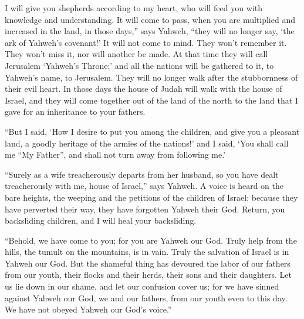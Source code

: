 {I will give you shepherds according to my heart, who will feed you with knowledge and understanding.
It will come to pass, when you are multiplied and increased in the land, in those days,” says Yahweh, “they will no longer say, ‘the ark of Yahweh’s covenant!’ It will not come to mind. They won’t remember it. They won’t miss it, nor will another be made.
At that time they will call Jerusalem ‘Yahweh’s Throne;’ and all the nations will be gathered to it, to Yahweh’s name, to Jerusalem. They will no longer walk after the stubbornness of their evil heart.
In those days the house of Judah will walk with the house of Israel, and they will come together out of the land of the north to the land that I gave for an inheritance to your fathers.
\par }{\PP {}“But I said, ‘How I desire to put you among the children, and give you a pleasant land, a goodly heritage of the armies of the nations!’ and I said, ‘You shall call me “My Father”, and shall not turn away from following me.’
\par }{\PP {}“Surely as a wife treacherously departs from her husband, so you have dealt treacherously with me, house of Israel,” says Yahweh.
A voice is heard on the bare heights, the weeping and the petitions of the children of Israel; because they have perverted their way, they have forgotten Yahweh their God.
Return, you backsliding children, and I will heal your backsliding.
\par }{\PP “Behold, we have come to you; for you are Yahweh our God.
Truly help from the hills, the tumult on the mountains, is in vain. Truly the salvation of Israel is in Yahweh our God.
But the shameful thing has devoured the labor of our fathers from our youth, their flocks and their herds, their sons and their daughters.
Let us lie down in our shame, and let our confusion cover us; for we have sinned against Yahweh our God, we and our fathers, from our youth even to this day. We have not obeyed Yahweh our God’s voice.”

}
